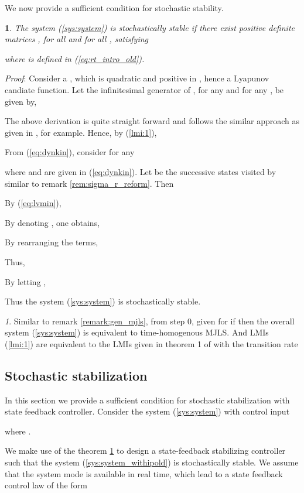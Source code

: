 \documentclass[10.5pt,a4paper]{article}
\theoremstyle{remark}
\theoremstyle{plain}
\newtheorem{thm}{\protect\theoremname}
\theoremstyle{plain}
\theoremstyle{remark}
\newtheorem{rem}{\protect\remarkname}
\theoremstyle{plain}
\theoremstyle{plain}
\providecommand{\remarkname}{Remark}
\providecommand{\theoremname}{Theorem}
\begin{document}
\noindent We now provide a sufficient condition for stochastic stability. 
\begin{thm}
\noindent \label{theorem:1} The system (\ref{sys:system}) is stochastically
stable if there exist positive definite matrices ,  for
all  and for all , satisfying 


 where  is defined in (\ref{eq:rt_intro_old}).
\end{thm}
\noindent \textit{Proof}: Consider a ,
which is quadratic and positive in , hence a Lyapunov candiate
function. Let the infinitesimal generator of , for any  and for any , be given by,

The above derivation is quite straight forward and follows the similar
approach as given in \cite{boukasbook}, \cite{costabook2012} for
example. Hence, by (\ref{lmi:1}),

From (\ref{eq:dynkin}), consider for any 

 where   and  are given
in (\ref{eq:dynkin}). Let 
be the successive states visited by  similar to remark
\ref{rem:sigma_r_reform}. Then 

By (\ref{eq:lvmin}), 

By denoting ,
one obtains, 

By rearranging the terms, 


\noindent Thus, 

By letting , 

Thus the system (\ref{sys:system}) is stochastically stable.\hfill{}


\begin{rem}Similar to remark \ref{remark:gen_mjls}, from step 0,
given  for  if 
then the overall system (\ref{sys:system}) is equivalent to time-homogenous
MJLS. And LMIs (\ref{lmi:1}) are equivalent to the LMIs given in
theorem 1 of \cite{boukasbook} with the transition rate \end{rem}


\subsection{Stochastic stabilization}

In this section we provide a sufficient condition for stochastic stabilization
with state feedback controller. Consider the system (\ref{sys:system})
with control input  

where .

We make use of the theorem \ref{theorem:1} to design a state-feedback
stabilizing controller such that the system (\ref{sys:system_withipold})
is stochastically stable. We assume that the system mode 
is available in real time, which lead to a state feedback control
law of the form 
\end{document}
